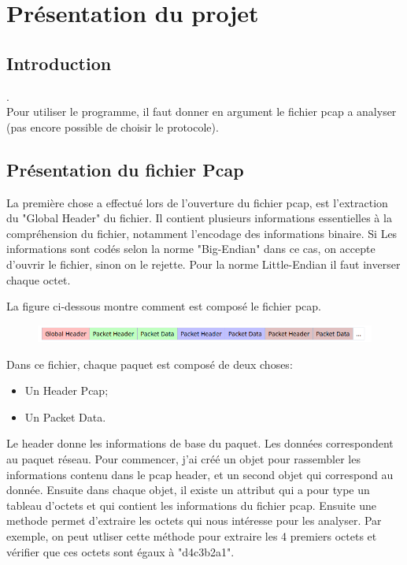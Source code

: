 \chapter{Présentation du projet}


\section{Introduction}

.\\
Pour utiliser le programme, il faut donner en argument le fichier pcap a analyser (pas encore possible de choisir le protocole).

\section{Présentation du fichier Pcap}

La première chose a effectué lors de l'ouverture du fichier pcap, est l'extraction du "Global Header" du fichier.
Il contient plusieurs informations essentielles à la compréhension du fichier, notamment l'encodage des informations binaire.
Si Les informations sont codés selon la norme "Big-Endian" dans ce cas, on accepte d'ouvrir le fichier, sinon on le rejette.
Pour la norme Little-Endian il faut inverser chaque octet.

La figure ci-dessous montre comment est composé le fichier pcap.
\begin{figure}[!h]
    \begin{center}
\includegraphics[width=15cm]{./globalHeader.png}
    \end{center}
\end{figure}

Dans ce fichier, chaque paquet est composé de deux choses:
\begin{itemize}
    \item Un Header Pcap;
    \item Un Packet Data.
\end{itemize}       
Le header donne les informations de base du paquet.
Les données correspondent au paquet réseau. 
Pour commencer, j'ai créé un objet pour rassembler les informations contenu dans le pcap header, et un second objet qui correspond au donnée.
Ensuite dans chaque objet, il existe un attribut qui a pour type un tableau d'octets et qui contient les informations du fichier pcap.
Ensuite une methode permet d'extraire les octets qui nous intéresse pour les analyser.
Par exemple, on peut utliser cette méthode pour extraire les 4 premiers octets et vérifier que ces octets sont égaux à "d4c3b2a1".


